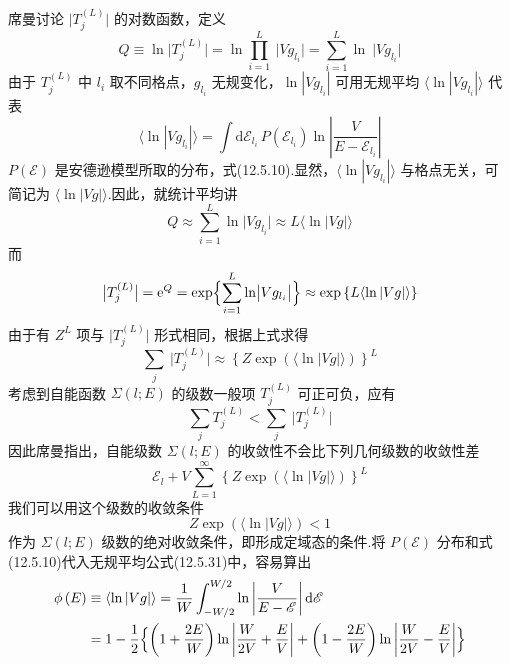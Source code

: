 席曼讨论 $\bigl|T_{j}^{(L)}\bigr|$ 的对数函数，定义
\begin{equation}
  Q\equiv\ln\bigl|T_{j}^{(L)}\bigr|
  =\ln\prod_{i=1}^{L}\ \bigl|Vg_{l_{i}}\bigr|
  =\sum_{i=1}^{L}\ln\ \bigl|Vg_{l_{i}}\bigr|
\end{equation}
由于 $T_{j}^{(L)}$ 中 $l_{i}$ 取不同格点，$g_{l_{i}}$ 无规变化，$\ln|Vg_{l_{i}}|$ 可用无规平均 $\langle\ln|Vg_{l_{i}}|\rangle$ 代表
\begin{equation}
  \langle\ln|Vg_{l_{i}}|\rangle=\int\mathrm{d}\mathscr{E}_{l_{i}}\,
  P\left(\mathscr{E}_{l_{i}}\right)\ln\left|\frac{V}{E-\mathscr{E}_{l_{i}}}\right|
\end{equation}
$P\left(\mathscr{E}\right)$ 是安德逊模型所取的分布，式(12.5.10).显然，$\langle\ln|Vg_{l_{i}}|\rangle$ 与格点无关，可简记为 $\langle\ln|Vg|\rangle$.因此，就统计平均讲
\begin{equation}
  Q\approx\sum_{i=1}^{L}\ln\bigl|Vg_{l_{i}}\bigr|
  \approx L\langle\ln|Vg|\rangle
\end{equation}
而
\begin{equation}
  \bigl|T_{j}^{(L)}\bigr|=\mathrm{e}^{Q}
  =\exp\Bigl\{\sum_{i=1}^{L}\ln\bigl|Vg_{l_{i}}\bigr|\Bigr\}
  \approx\exp\left\{L\langle\ln|Vg|\rangle\right\}
\end{equation}
由于有 $Z^{L}$ 项与 $\bigl|T_{j}^{(L)}\bigr|$ 形式相同，根据上式求得
\begin{equation}
  \sum_{j}\ \bigl|T_{j}^{(L)}\bigr|
  \approx\left\{Z\exp\left(\langle\ln|Vg|\rangle\right)\right\}^{L}
\end{equation}
考虑到自能函数 $\Sigma\left(l;E\right)$ 的级数一般项 $T_{j}^{(L)}$ 可正可负，应有
\begin{equation}
  \sum_{j}T_{j}^{(L)}<\sum_{j}\ \bigl|T_{j}^{(L)}\bigr|
\end{equation}
因此席曼指出，自能级数 $\Sigma\left(l;E\right)$ 的收敛性不会比下列几何级数的收敛性差
\begin{equation}
  \mathscr{E}_{l}+V\sum_{L=1}^{\infty}
  \left\{Z\exp\left(\langle\ln|Vg|\rangle\right)\right\}^{L}
\end{equation}
我们可以用这个级数的收敛条件
\begin{equation}
  Z\exp\left(\langle\ln|Vg|\rangle\right)<1
\end{equation}
作为 $\Sigma\left(l;E\right)$ 级数的绝对收敛条件，即形成定域态的条件.将 $P\left(\mathscr{E}\right)$ 分布和式(12.5.10)代入无规平均公式(12.5.31)中，容易算出
\begin{equation}
\begin{aligned}
  \phi\left(E\right)&\equiv\langle\ln|Vg|\rangle
  =\frac{1}{W}\int_{-W/2}^{W/2}\ln\left|\frac{V}{E-\mathscr{E}}\right|\mathrm{d}\mathscr{E}\\
  &=1-\frac{1}{2}\Bigl\{\left(1+\frac{2E}{W}\right)\ln\left|\frac{W}{2V}+\frac{E}{V}\right|
  +\left(1-\frac{2E}{W}\right)\ln\left|\frac{W}{2V}-\frac{E}{V}\right|\Bigr\}
\end{aligned}
\end{equation}
